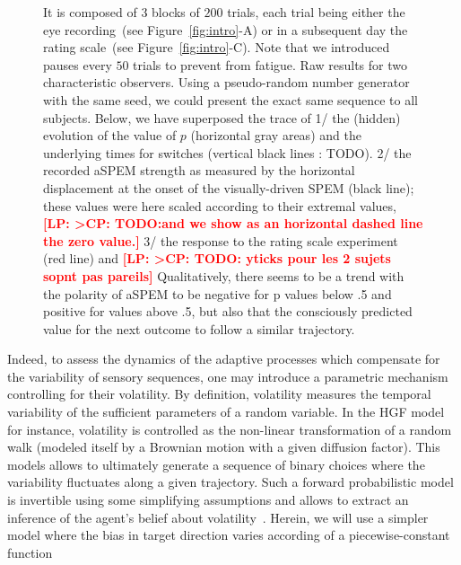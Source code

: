 \documentclass[profile,final,english,draft]{article}%
\newcommand{\citep}[1]{\parencite{#1}}
\newcommand{\seeFig}[1]{Figure~\ref{fig:#1}}
\newcommand{\LP}[1]{\textbf{\textcolor{red}{[LP: #1]}}}
\begin{document}
\begin{figure}
{It is composed of 3 blocks of $200$ trials,
each trial being either the eye recording~(see \seeFig{intro}-A)
or in a subsequent day the rating scale~(see \seeFig{intro}-C).
Note that we introduced pauses every $50$ trials to prevent from fatigue.
Raw results for two characteristic observers.
Using a pseudo-random number generator with the same seed,
we could present the exact same sequence to all subjects. %
Below, we have superposed the trace of
1/ the (hidden) evolution of the value of $p$ (horizontal gray areas)
and the underlying times for switches (vertical black lines : TODO).
2/ the recorded aSPEM strength as measured by the horizontal displacement
at the onset of the visually-driven SPEM (black line);
these values were here scaled according to their extremal values,
\LP{>CP: TODO:and we show as an horizontal dashed line the zero value.}
3/ the response to the rating scale experiment (red line) and
\LP{>CP: TODO: yticks pour les 2 sujets sopnt pas pareils}
Qualitatively, there seems to be a trend with the polarity of aSPEM
to be negative for p values below .5 and positive for values above .5,
but also that the consciously predicted value
for the next outcome
to follow a similar trajectory.
}
\label{fig:results_raw}
\end{figure}
Indeed, to assess the dynamics of the adaptive processes
which compensate for the variability of sensory sequences,
one may introduce a parametric mechanism controlling for their volatility.
By definition, volatility measures the temporal variability
of the sufficient parameters of a random variable.
In the HGF model~\citep{Matthys2011} for instance,
volatility is controlled as the non-linear transformation
of a random walk (modeled itself by a Brownian motion with a given diffusion factor).
This models allows to ultimately generate a sequence of binary choices
where the variability fluctuates along a given trajectory.
Such a forward probabilistic model is invertible
using some simplifying assumptions and allows
to extract an inference of the agent's belief about volatility~\citep{Voessel??}.
Herein, we will use a simpler model where
the bias in target direction varies according of a piecewise-constant function
\end{document}
